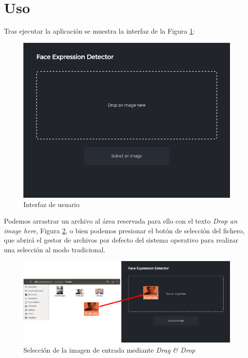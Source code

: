 \documentclass[a4paper,11pt]{book}
\begin{document}
\section{Uso}
Tras ejecutar la aplicación se muestra la interfaz de la Figura \ref{fig:UI}:\\
\begin{figure}[h]
\centering
\includegraphics[width=0.6\linewidth]{imagenes/UI}
\caption[Interfaz de Usuario]{Interfaz de usuario}
\label{fig:UI}
\end{figure}

Podemos arrastrar un archivo al área reservada para ello con el texto \textit{Drop an image here}, Figura \ref{fig:dragdrop}, o bien podemos presionar el botón de selección del fichero, que abrirá el gestor de archivos por defecto del sistema operativo para realizar una selección al modo tradicional.
\begin{figure}[h]
\centering
\includegraphics[width=1.1\linewidth]{imagenes/dragdrop}
\caption[Drag and Drop]{Selección de la imagen de entrada mediante \textit{Drag \& Drop}}
\label{fig:dragdrop}
\end{figure}
\end{document}
